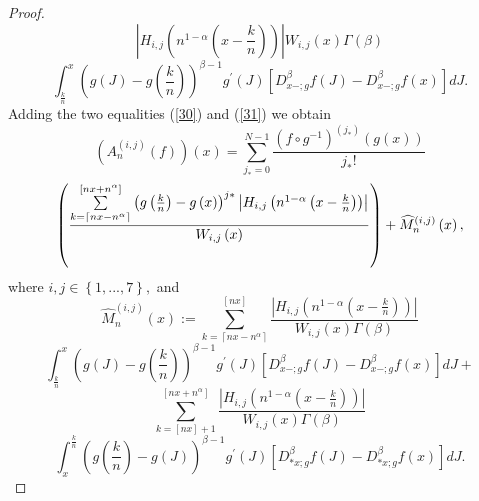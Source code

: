\documentclass[10pt]{NSP1}
\numberwithin{equation}{section}
\begin{document}
\begin{proof}
\begin{equation*}
{\left \vert H_{i,j}\left( n^{1-\alpha }\left( x-\frac{k}{n}\right) \right)
\right \vert }{W_{i,j}\left( x\right) \Gamma \left( \beta \right) }
\end{equation*}
\begin{equation}
\int_{\frac{k}{n}}^{x}\left( g\left( J\right) -g\left( \frac{k}{n}\right)
\right) ^{\beta -1}g^{\prime }\left( J\right) \left[ D_{x-;g}^{\beta
}f\left( J\right) -D_{x-;g}^{\beta }f\left( x\right) \right] dJ.  \tag{31}
\label{31}
\end{equation}
Adding the two equalities (\ref{30}) and (\ref{31}) we obtain
\begin{equation}
\left( A_{n}^{\left( i,j\right) }\left( f\right) \right) \left( x\right)
=\sum_{j_{\ast }=0}^{N-1}\frac{\left( f\circ g^{-1}\right) ^{\left( j_{\ast
}\right) }\left( g\left( x\right) \right) }{j_{\ast }!}  \tag{32}  \label{32}
\end{equation}
\begin{equation*}
\left( \frac{\sum \limits_{k=\left \lceil nx-n^{\alpha }\right \rceil }^{%
\left[ nx+n^{\alpha }\right] }\left( g\left( \frac{k}{n}\right) -g\left(
x\right) \right) ^{j\ast }\left \vert H_{i,j}\left( n^{1-\alpha }\left( x-%
\frac{k}{n}\right) \right) \right \vert }{W_{i,j}\left( x\right) }\right) +%
\widehat{M}_{n}^{\left( i,j\right) }\left( x\right) ,
\end{equation*}
where $i,j\in \left \{ 1,...,7\right \} ,$ and
\begin{equation}
\widehat{M}_{n}^{\left( i,j\right) }\left( x\right) :=\sum_{k=\left \lceil
nx-n^{\alpha }\right \rceil }^{\left[ nx\right] }\frac{\left \vert
H_{i,j}\left( n^{1-\alpha }\left( x-\frac{k}{n}\right) \right) \right \vert
}{W_{i,j}\left( x\right) \Gamma \left( \beta \right) }  \tag{33}  \label{33}
\end{equation}
\begin{equation*}
\int_{\frac{k}{n}}^{x}\left( g\left( J\right) -g\left( \frac{k}{n}\right)
\right) ^{\beta -1}g^{\prime }\left( J\right) \left[ D_{x-;g}^{\beta
}f\left( J\right) -D_{x-;g}^{\beta }f\left( x\right) \right] dJ+
\end{equation*}
\begin{equation*}
\sum_{k=\left[ nx\right] +1}^{\left[ nx+n^{\alpha }\right] }\frac{\left
\vert H_{i,j}\left( n^{1-\alpha }\left( x-\frac{k}{n}\right) \right) \right
\vert }{W_{i,j}\left( x\right) \Gamma \left( \beta \right) }
\end{equation*}
\begin{equation*}
\int_{x}^{\frac{k}{n}}\left( g\left( \frac{k}{n}\right) -g\left( J\right)
\right) ^{\beta -1}g^{\prime }\left( J\right) \left[ D_{\ast x;g}^{\beta
}f\left( J\right) -D_{\ast x;g}^{\beta }f\left( x\right) \right] dJ.
\end{equation*}


\end{proof}
\end{document}
